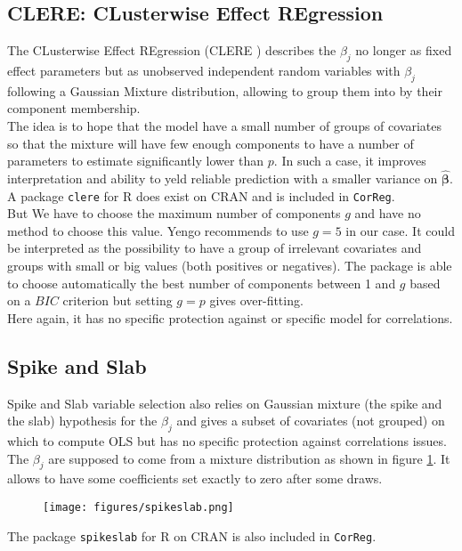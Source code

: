 \documentclass[12pt,a4paper]{report}
\begin{document}
		\subsection{CLERE: CLusterwise Effect REgression}		%

			The CLusterwise Effect REgression (\textsc{CLERE} \cite{yengo2012variable}) describes the $\beta_j$ no longer as fixed effect parameters but as unobserved independent random variables with $\beta_j$ following a Gaussian Mixture distribution, allowing to group them into by their component membership. \\
			
			 The idea is to hope that the model have a small number of groups of covariates so that the mixture will have few enough components to have a number of parameters to estimate significantly lower than $p$. In such a case, it improves interpretation and ability to yeld reliable prediction with a smaller variance on $\boldsymbol{\hat{\beta}}$. A package {\tt clere} for R does exist on CRAN and is included in {\tt CorReg}. \\
			 But We have to choose the maximum number of components $g$ and have no method to choose this value. Yengo recommends to use $g=5$ in our case. It could be interpreted as the possibility to have a group of irrelevant covariates and groups with small or big values (both positives or negatives). The package is able to choose automatically the best number of components between 1 and $g$ based on a $BIC$ criterion but setting $g=p$ gives over-fitting. \\
	 Here again, it has no specific protection against or specific model for correlations. 
		\subsection{Spike and Slab}			%

			Spike and Slab variable selection \cite{ishwaran2005spike} also relies on Gaussian mixture (the spike and the slab) hypothesis for the $\beta_j$ and gives a subset of covariates (not grouped) on which to compute \textsc{OLS} but has no specific protection against correlations issues.  The $\beta_j$ are supposed to come from a mixture distribution as shown in figure \ref{spikeslab}. It allows to have some coefficients set exactly to zero after some draws. 
			
\begin{figure}[h!]
	\centering
	\texttt{[image: figures/spikeslab.png]} 
	\caption{}\label{spikeslab}
\end{figure}		
		The package {\tt spikeslab} for R on CRAN is also included in {\tt CorReg}. \\
		
\end{document}
